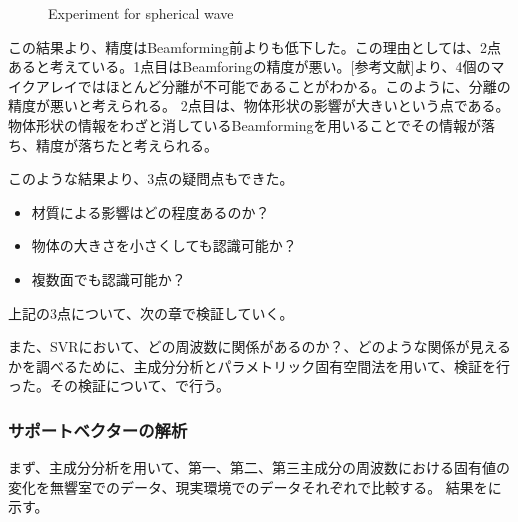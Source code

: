 \begin{figure}[tb]
    \centering
    \label{fig:beam_check_intensity}
    \label{fig:beam_check_svr}
    \caption{Experiment for spherical wave}
    \label{fig:beam_check}
\end{figure}

この結果より、精度はBeamforming前よりも低下した。この理由としては、2点あると考えている。1点目はBeamforingの精度が悪い。[参考文献]より、4個のマイクアレイではほとんど分離が不可能であることがわかる。このように、分離の精度が悪いと考えられる。
2点目は、物体形状の影響が大きいという点である。物体形状の情報をわざと消しているBeamformingを用いることでその情報が落ち、精度が落ちたと考えられる。

このような結果より、3点の疑問点もできた。
\begin{itemize}
    \item 材質による影響はどの程度あるのか？
    \item 物体の大きさを小さくしても認識可能か？
    \item 複数面でも認識可能か？
\end{itemize}
上記の3点について、次の章で検証していく。

また、SVRにおいて、どの周波数に関係があるのか？、どのような関係が見えるかを調べるために、主成分分析とパラメトリック固有空間法を用いて、検証を行った。その検証について、で行う。

\subsubsection{サポートベクターの解析}
\label{sec:PCA}
まず、主成分分析を用いて、第一、第二、第三主成分の周波数における固有値の変化を無響室でのデータ、現実環境でのデータそれぞれで比較する。
結果をに示す。


